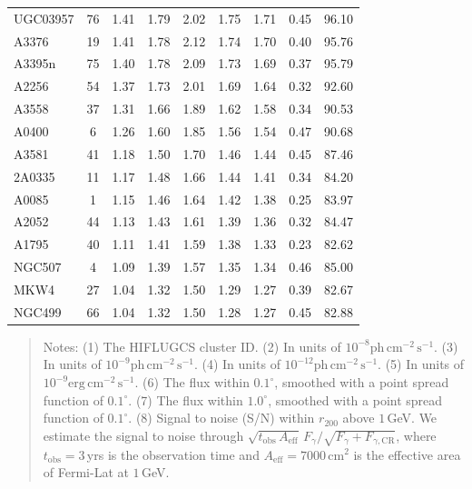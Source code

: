 \documentclass[10pt,aps,pra,reprint,amsmath,amsfonts,amssymb,showpacs,nofootinbib,floatfix]{revtex4-1}
\newcommand{\rmn}{\mathrm}
\newcommand{\cm}{\rmn{cm}}
\newcommand{\vstt}{\vspace{-0.0mm}}
\newcommand{\CR}{\rmn{CR}}
\newcommand{\rvir}{r_{200}}
\begin{document}
\begin{table}
\begin{minipage}{2.0\columnwidth}
\begin{tabular}{l c c c c c c c c}
UGC03957 &  76 &   1.41 &   1.79 &   2.02 &   1.75 &   1.71 &   0.45 &  96.10 \vstt \\
A3376    &  19 &   1.41 &   1.78 &   2.12 &   1.74 &   1.70 &   0.40 &  95.76 \vstt \\
A3395n   &  75 &   1.40 &   1.78 &   2.09 &   1.73 &   1.69 &   0.37 &  95.79 \vstt \\
A2256    &  54 &   1.37 &   1.73 &   2.01 &   1.69 &   1.64 &   0.32 &  92.60 \vstt \\
A3558    &  37 &   1.31 &   1.66 &   1.89 &   1.62 &   1.58 &   0.34 &  90.53 \vstt \\
A0400    &   6 &   1.26 &   1.60 &   1.85 &   1.56 &   1.54 &   0.47 &  90.68 \vstt \\
A3581    &  41 &   1.18 &   1.50 &   1.70 &   1.46 &   1.44 &   0.45 &  87.46 \vstt \\
2A0335   &  11 &   1.17 &   1.48 &   1.66 &   1.44 &   1.41 &   0.34 &  84.20 \vstt \\
A0085    &   1 &   1.15 &   1.46 &   1.64 &   1.42 &   1.38 &   0.25 &  83.97 \vstt \\
A2052    &  44 &   1.13 &   1.43 &   1.61 &   1.39 &   1.36 &   0.32 &  84.47 \vstt \\
A1795    &  40 &   1.11 &   1.41 &   1.59 &   1.38 &   1.33 &   0.23 &  82.62 \vstt \\
NGC507   &   4 &   1.09 &   1.39 &   1.57 &   1.35 &   1.34 &   0.46 &  85.00 \vstt \\
MKW4     &  27 &   1.04 &   1.32 &   1.50 &   1.29 &   1.27 &   0.39 &  82.67 \vstt \\
NGC499   &  66 &   1.04 &   1.32 &   1.50 &   1.28 &   1.27 &   0.45 &  82.88 \vstt \\
\hline
\hline
\end{tabular}
\begin{quote}
  Notes:
   (1) The HIFLUGCS cluster ID.
   (2) In units of $10^{-8} \rmn{ph}\,\rmn{cm}^{-2}\,\rmn{s}^{-1}$.
   (3) In units of $10^{-9} \rmn{ph}\,\rmn{cm}^{-2}\,\rmn{s}^{-1}$.
   (4) In units of $10^{-12} \rmn{ph}\,\rmn{cm}^{-2}\,\rmn{s}^{-1}$.
   (5) In units of $10^{-9} \rmn{erg}\,\rmn{cm}^{-2}\,\rmn{s}^{-1}$.
   (6) The flux within $0.1^\circ$, smoothed with a point spread function of $0.1^\circ$.
   (7) The flux within $1.0^\circ$, smoothed with a point spread function of $0.1^\circ$.
   (8) Signal to noise (S/N) within $\rvir$ above $1\,$GeV. We estimate the signal to
  noise through $\sqrt{t_\rmn{obs}\,A_\rmn{eff}}\,F_{\gamma}/\sqrt{F_{\gamma}+F_{\gamma,\CR}}$,
  where $t_\rmn{obs}=3\,$yrs is the observation time and $A_\rmn{eff} = 7000\,\cm^2$
    is the effective area of Fermi-Lat at $1\,$GeV.
 \label{tab:flux_tab_LP}
  \end{quote}
\end{minipage}
\end{table}
\end{document}
